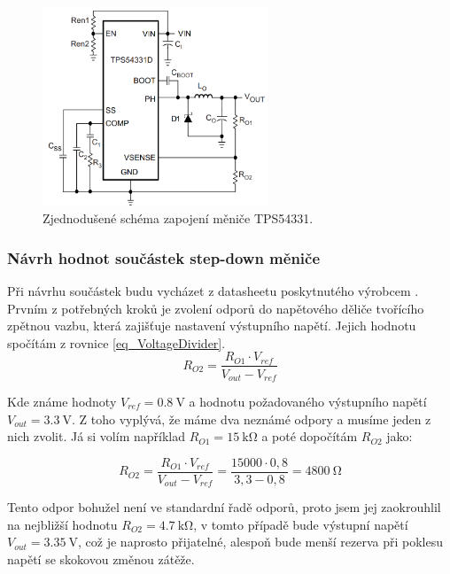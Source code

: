 \begin{figure}
    \centering
    \includegraphics[width=0.6\textwidth]{obrazky/schematicTPS54331.png}
    \caption{Zjednodušené schéma zapojení měniče TPS54331.\cite{dat_TPS54331}}
    \label{fig_Schematic-TPS54331}
\end{figure}

\subsubsection{Návrh hodnot součástek step-down měniče}

Při návrhu součástek budu vycházet z datasheetu poskytnutého výrobcem \cite{dat_TPS54331}. Prvním z potřebných kroků je zvolení odporů do napětového děliče tvořícího zpětnou vazbu, která zajišťuje nastavení výstupního napětí. Jejich hodnotu spočítám z rovnice \ref{eq_VoltageDivider}.
\begin{equation}
    R_{O2}=\frac{R_{O1}\cdot V_{ref}}{V_{out}-V_{ref}}
    \label{eq_VoltageDivider}
\end{equation}

Kde známe hodnoty $V_{ref} = \SI{0,8}{\volt}$ a hodnotu požadovaného výstupního napětí $V_{out} = \SI{3,3}{\volt}$. Z toho vyplývá, že máme dva neznámé odpory a musíme jeden z nich zvolit. Já si volím například $R_{O1}=\SI{15}{\kilo\ohm}$ a poté dopočítám $R_{O2}$ jako:

\begin{equation}
    R_{O2}=\frac{R_{O1}\cdot V_{ref}}{V_{out}-V_{ref}}=\frac{15000\cdot 0,8}{3,3-0,8}=\SI{4800}{\ohm}
    \label{eq_VoltageDivider-full}
\end{equation}

Tento odpor bohužel není ve standardní řadě odporů, proto jsem jej zaokrouhlil na nejbližší hodnotu $R_{O2}=\SI{4,7}{\kilo\ohm}$, v tomto případě bude výstupní napětí $V_{out}=\SI{3,35}{\volt}$, což je naprosto přijatelné, alespoň bude menší rezerva při poklesu napětí se skokovou změnou zátěže.

